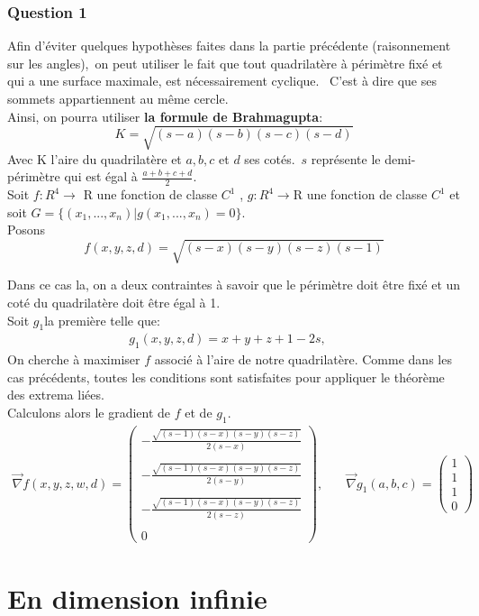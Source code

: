 \documentclass[12pt]{report}
\begin{document}
\section{Question 1}
Afin d'éviter quelques hypothèses faites dans la partie précédente (raisonnement sur les angles),\ on peut utiliser le fait que tout quadrilatère à périmètre fixé et qui a une surface maximale, est nécessairement cyclique. \ C'est à dire que ses sommets appartiennent au même cercle.\\
Ainsi, on pourra utiliser \textbf{la formule de Brahmagupta}:
\begin{equation}
   K={\sqrt{(s-a)(s-b)(s-c)(s-d)}} 
\end{equation}
Avec K l'aire du quadrilatère et $a,b,c$ et $d$ ses cotés.\ $s$ représente le demi-périmètre qui est égal à $\frac{a+b+c+d}{2}$.\\
\indent Soit $f:R^{4}\longrightarrow$ R une fonction de classe $C^{1}$ , $g:R^{4}\longrightarrow$R une fonction de classe
$C^{1}$ et soit $ G = \lbrace (x_{1},...,x_{n})\vert g(x_{1},...,x_{n})=0\rbrace.$\\
\indent Posons 
\begin{equation}
    f(x,y,z,d)={\sqrt{(s-x)(s-y)(s-z)(s-1)}} 
\end{equation}

Dans ce cas la, on a deux contraintes à savoir que le périmètre doit être fixé et un coté du quadrilatère doit être égal à 1.\\
\indent Soit $g_{1}$la première telle que:
\begin{align*}
     g_{1}(x,y,z,d)=x+y+z+1-2s,\quad 
\end{align*}
On cherche à maximiser $f$ associé à l'aire de notre quadrilatère.
Comme dans les cas précédents, toutes les conditions sont satisfaites pour appliquer le théorème des extrema liées.\\
Calculons alors le gradient de $f$ et de $g_{1}$.
\begin{align*}
\overrightarrow{\nabla}f(x,y,z,w,d) = 
\left(\begin{matrix}
-\frac{\sqrt{\left(s - 1\right) \left(s - x\right) \left(s - y\right) \left(s - z\right)} }{2 \left(s - x\right)}\\ \\
- \frac{\sqrt{\left(s - 1\right) \left(s - x\right) \left(s - y\right) \left(s - z\right)}}{2 \left(s - y\right)}\\ \\
- \frac{\sqrt{\left(s - 1\right) \left(s - x\right) \left(s - y\right) \left(s - z\right)}}{2 \left(s - z\right)}\\ \\
0
\end{matrix}\right),\quad          &  \overrightarrow{\nabla}g_{1}(a,b,c) = 
\left(\begin{matrix}
1 \\ 
1 \\ 
1 \\ 
0
\end{matrix}\right)      
\end{align*}
\part{En dimension infinie}
\end{document}
